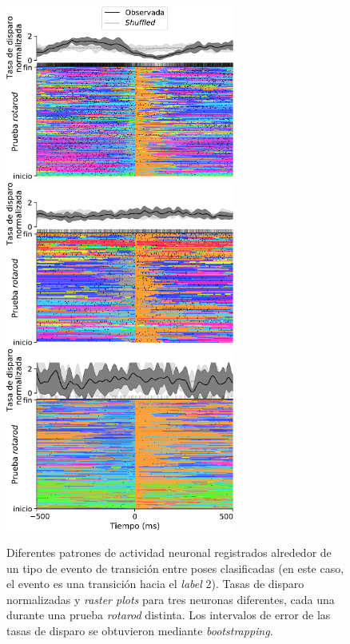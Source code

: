 \begin{figure}[!htbp]
\centering
\includegraphics[width=0.67\textwidth]{figuras/expertos/disparo/raster_mouse3_day10_trial08_label2_neuronSPKC11a.pdf}
\vspace{1em}
\includegraphics[width=0.67\textwidth]{figuras/expertos/disparo/raster_mouse3_day04_trial08_label2_neuronSPKC11a.pdf}
\vspace{1em}
\includegraphics[width=0.67\textwidth]{figuras/expertos/disparo/raster_mouse3_day05_trial10_label2_neuronSPKC09a.pdf}
\caption{Diferentes patrones de actividad neuronal registrados alrededor de un tipo de evento de transición entre poses clasificadas (en este caso, el evento es una transición hacia el \textit{label} 2). Tasas de disparo normalizadas y \textit{raster plots} para tres neuronas diferentes, cada una durante una prueba \textit{rotarod} distinta. Los intervalos de error de las tasas de disparo se obtuvieron mediante \textit{bootstrapping}.}
\label{fig:disparos_label2}
\end{figure}

